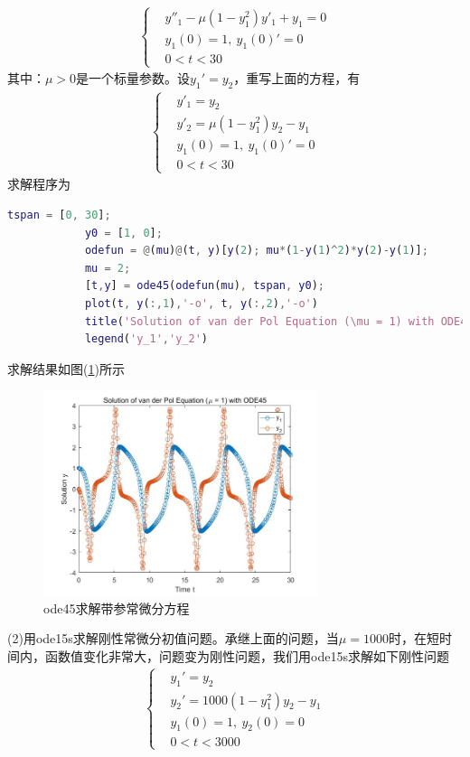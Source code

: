 	        \begin{align*}
			\left\{
			\begin{aligned}
			& y''_1 - \mu \left( 1 - y_1^2\right) y'_1+y_1=0\\
			& y_1(0)=1,\ y_1(0)'=0\\
			& 0<t<30
			\end{aligned}
			\right.
	        \end{align*}
	        其中：$\mu > 0$是一个标量参数。设$y_1'=y_2$，重写上面的方程，有
	        \begin{align*}
			\left\{
			\begin{aligned}
			& y'_1 = y_2\\
			& y'_2 = \mu (1-y_1^2) y_2 - y_1\\
			& y_1(0)=1,\ y_1(0)'=0\\
			& 0<t<30
			\end{aligned}
			\right.
	        \end{align*}
	        求解程序为
	        \begin{lstlisting}[language = Matlab]
			tspan = [0, 30];
			y0 = [1, 0];
			odefun = @(mu)@(t, y)[y(2); mu*(1-y(1)^2)*y(2)-y(1)];
			mu = 2;
			[t,y] = ode45(odefun(mu), tspan, y0);
			plot(t, y(:,1),'-o', t, y(:,2),'-o')
			title('Solution of van der Pol Equation (\mu = 1) with ODE45');
			legend('y_1','y_2')
	        \end{lstlisting}
	        求解结果如图(\ref{ode45求解带参常微分方程})所示
			\begin{figure}[H]
	        \centering
	        \includegraphics[width=8cm]{images/ode45solveParam.jpg}
	        \caption{ode45求解带参常微分方程}
	        \label{ode45求解带参常微分方程}
	        \end{figure}
	        (2)用ode15s求解刚性常微分初值问题。承继上面的问题，当$\mu=1000$时，在短时间内，函数值变化非常大，问题变为刚性问题，我们用ode15s求解如下刚性问题
	        \begin{align*}
			\left\{
			\begin{aligned}
			& y_1' = y_2\\
			& y_2' = 1000(1-y_1^2)y_2-y_1\\
			& y_1(0)=1,\ y_2(0)=0\\
			& 0<t<3000
			\end{aligned}
			\right.
	        \end{align*}
